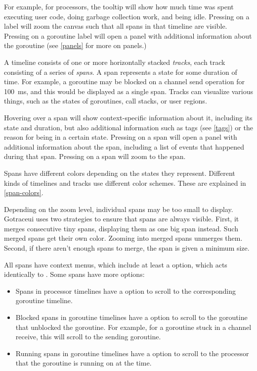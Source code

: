 \documentclass[10pt,letterpaper,oneside,openany,english]{memoir}
\newcommand{\noun}[1]{{\emph{#1}}}
\newcommand{\shortcut}{\ctrl{} or \cmdmac}
\begin{document}
For example, for processors, the tooltip will show how much time was spent executing user code,
doing garbage collection work,
and being idle.
Pressing \keys{\shortcut+LMB} on a label will zoom the canvas such that all spans in that timeline are visible.
Pressing  on a goroutine label will open a panel with additional information about the goroutine (see \cref{panels} for more on panels.)

A timeline consists of one or more horizontally stacked \noun{tracks},
each track consisting of a series of \noun{spans}.
A span represents a state for some duration of time.
For example, a goroutine may be blocked on a channel send operation for \qty{100}{\milli\second}, and this would be displayed as a single span.
Tracks can visualize various things, such as the states of goroutines, call stacks, or user regions.

Hovering over a span will show context-specific information about it,
including its state and duration,
but also additional information such as tags (see \cref{tags})
or the reason for being in a certain state.
Pressing  on a span will open a panel with additional information about the span, including a list of events that happened during that span.
Pressing \keys{\shortcut+LMB} on a span will zoom to the span.

Spans have different colors depending on the states they represent.
Different kinds of timelines and tracks use different color schemes.
These are explained in \cref{span-colors}.

Depending on the zoom level, individual spans may be too small to display.
Gotraceui uses two strategies to ensure that spans are always visible.
First, it merges consecutive tiny spans, displaying them as one big span instead.
Such merged spans get their own color.
Zooming into merged spans unmerges them.
Second, if there aren't enough spans to merge, the span is given a minimum size.

All spans have context menus, which include at least a  option, which acts identically to \keys{\shortcut+LMB}.
Some spans have more options:

\begin{itemize}
\item Spans in processor timelines have a  option to scroll to the corresponding goroutine timeline.
\item Blocked spans in goroutine timelines have a  option to scroll to the goroutine that unblocked the goroutine.
  For example, for a goroutine stuck in a channel receive, this will scroll to the sending goroutine.
\item Running spans in goroutine timelines have a  option to scroll to the processor that the goroutine is running on at the time.
\end{itemize}
\end{document}
